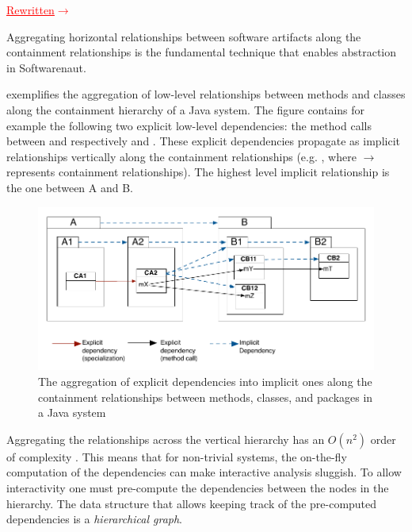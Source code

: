 \documentclass[preprint,12pt]{elsarticle}
\newcommand{\ra}{$\rightarrow$}
\newcommand{\rewritten}{\textcolor{red}{\uline{Rewritten}\ra\space }} %
\begin{document}
\rewritten 

Aggregating horizontal relationships between software artifacts along the containment relationships is the fundamental technique that enables abstraction in Softwarenaut. 

 exemplifies the aggregation of low-level relationships between methods and classes along the containment hierarchy of a Java system. 
The figure contains for example the following two explicit low-level dependencies: the method calls between  and respectively  and . These explicit dependencies propagate as implicit relationships vertically along the containment relationships (e.g. , where $\rightarrow$ represents containment relationships). The highest level implicit relationship is the one between A and B. 

\begin{figure}[ht]
\begin{center}
\includegraphics[width=0.9\linewidth]{DependencyAggregation}
\caption{The aggregation of explicit dependencies into implicit ones along the containment relationships between methods, classes, and packages in a Java system}
\end{center}
\end{figure}


Aggregating the relationships across the vertical hierarchy has an $O(n^2)$ order of complexity \cite{buchsbaum-hierarchicalgraphs}. This means that for non-trivial systems, the on-the-fly computation of the dependencies can make interactive analysis sluggish. To allow interactivity one must pre-compute the dependencies between the nodes in the hierarchy. The data structure that allows keeping track of the pre-computed dependencies is a {\em hierarchical graph}. 


\end{document}
